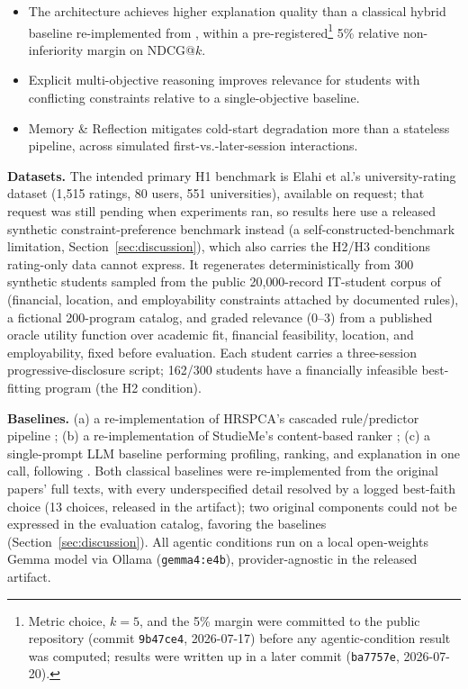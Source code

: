 \documentclass[conference]{IEEEtran}
\begin{document}
\begin{itemize}[leftmargin=1.9em, labelwidth=1.6em, labelsep=0.3em, align=left, itemsep=1pt, topsep=2pt]
\item[\textbf{H1.}] The architecture achieves higher explanation quality than a
classical hybrid baseline re-implemented from \cite{hrspca,studieme}, within a
pre-registered\footnote{Metric choice, $k=5$, and the 5\% margin were committed to the
public repository (commit \texttt{9b47ce4}, 2026-07-17) before any agentic-condition
result was computed; results were written up in a later commit (\texttt{ba7757e},
2026-07-20).} 5\% relative non-inferiority margin on NDCG@$k$.
\item[\textbf{H2.}] Explicit multi-objective reasoning improves relevance for students
with conflicting constraints relative to a single-objective baseline.
\item[\textbf{H3.}] Memory \& Reflection mitigates cold-start degradation more than a
stateless pipeline, across simulated first-vs.-later-session interactions.
\end{itemize}

\textbf{Datasets.} The intended primary H1 benchmark is Elahi et al.'s
\cite{universityrecsyselahi} university-rating dataset (1{,}515 ratings, 80 users, 551
universities), available on request; that request was still pending when experiments ran,
so results here use a released synthetic constraint-preference benchmark instead (a
self-constructed-benchmark limitation, Section~\ref{sec:discussion}), which also carries
the H2/H3 conditions rating-only data cannot express. It
regenerates deterministically from 300 synthetic students sampled from the public
20{,}000-record IT-student corpus of \cite{careerrecfeatureselection} (financial,
location, and employability constraints attached by documented rules), a fictional
200-program catalog, and graded relevance (0--3) from a published oracle utility function
over academic fit, financial feasibility, location, and employability, fixed before
evaluation. Each student carries a three-session progressive-disclosure script;
162/300 students have a financially infeasible best-fitting program (the H2 condition).

\textbf{Baselines.} (a) a re-implementation of HRSPCA's cascaded rule/predictor pipeline
\cite{hrspca}; (b) a re-implementation of StudieMe's content-based ranker \cite{studieme};
(c) a single-prompt LLM baseline performing profiling, ranking, and explanation in one
call, following \cite{onlinecoursemaskg}. Both classical baselines were re-implemented
from the original papers' full texts, with every underspecified detail resolved by a
logged best-faith choice (13 choices, released in the artifact); two original components
could not be expressed in the evaluation catalog, favoring the baselines
(Section~\ref{sec:discussion}). All agentic conditions run on a local open-weights Gemma
model via Ollama (\texttt{gemma4:e4b}), provider-agnostic in the released artifact.
\end{document}
